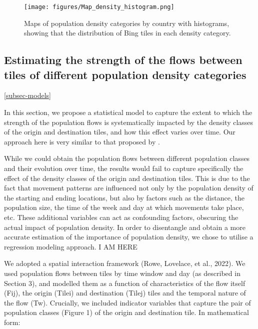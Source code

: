 \documentclass[11pt,letterpaper]{article}
\begin{document}
\begin{figure}[H]

{\centering \texttt{[image: figures/Map\_density\_histogram.png]}

}

\caption{Maps of population density categories by country with
histograms, showing that the distribution of Bing tiles in each density
category.}

\end{figure}%

\subsection{Estimating the strength of the flows between tiles of different population density categories}

\ref{subsec-models}

In this section, we propose a statistical model to capture the extent to
which the strength of the population flows is systematically impacted by
the density classes of the origin and destination tiles, and how this
effect varies over time. Our approach here is very similar to that
proposed by \cite{Rowe}.

While we could obtain the population flows between different population
classes and their evolution over time, the results would fail to capture
specifically the effect of the density classes of the origin and
destination tiles. This is due to the fact that movement patterns are
influenced not only by the population density of the starting and ending
locations, but also by factors such as the distance, the population
size, the time of the week and day at which movements take place, etc.
These additional variables can act as confounding factors, obscuring the
actual impact of population density. In order to disentangle and obtain
a more accurate estimation of the importance of population density, we
chose to utilise a regression modeling approach. I AM HERE

We adopted a spatial interaction framework (Rowe, Lovelace, et al.,
2022). We used population flows between tiles by time window and day (as
described in Section 3), and modelled them as a function of
characteristics of the flow itself (Fij), the origin (Tilei) and
destination (Tilej) tiles and the temporal nature of the flow (Tw).
Crucially, we included indicator variables that capture the pair of
population classes (Figure 1) of the origin and destination tile. In
mathematical form:
\end{document}
